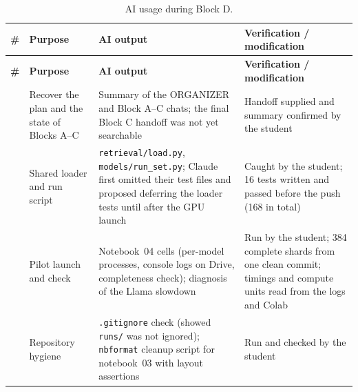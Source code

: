 \documentclass[11pt,a4paper]{report}
\begin{document}
{\small
\renewcommand{\arraystretch}{1.25}
\begin{longtable}{
  >{\raggedright\arraybackslash}p{0.6cm}
  >{\raggedright\arraybackslash}p{4.4cm}
  >{\raggedright\arraybackslash}p{4.4cm}
  >{\raggedright\arraybackslash}p{4.8cm}}
\caption{AI usage during Block D.}\label{tab:ailog-d}\\
\toprule
\textbf{\#} & \textbf{Purpose} & \textbf{AI output} & \textbf{Verification / modification} \\
\midrule
\endfirsthead
\toprule
\textbf{\#} & \textbf{Purpose} & \textbf{AI output} & \textbf{Verification / modification} \\
\midrule
\endhead
\bottomrule
\endfoot
78 & Recover the plan and the state of Blocks A--C
  & Summary of the ORGANIZER and Block A--C chats; the final Block C handoff was not yet searchable
  & Handoff supplied and summary confirmed by the student \\
79 & Shared loader and run script
  & \texttt{retrieval/load.py}, \texttt{models/run\_set.py}; Claude first omitted their test files and proposed deferring the loader tests until after the GPU launch
  & Caught by the student; 16 tests written and passed before the push (168 in total) \\
80 & Pilot launch and check
  & Notebook~04 cells (per-model processes, console logs on Drive, completeness check); diagnosis of the Llama slowdown
  & Run by the student; 384 complete shards from one clean commit; timings and compute units read from the logs and Colab \\
81 & Repository hygiene
  & \texttt{.gitignore} check (showed \texttt{runs/} was not ignored); \texttt{nbformat} cleanup script for notebook~03 with layout assertions
  & Run and checked by the student \\



\end{longtable}}
\end{document}
